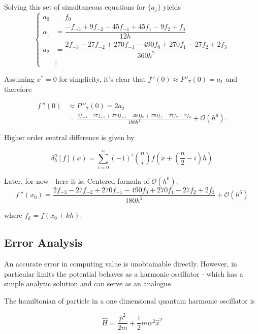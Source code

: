 Solving this set of simultaneous equations for $\{a_j\}$ yields
\begin{equation}
\begin{cases}
a_0 &= f_{0}\\[0.3cm]
a_1 &= \dfrac{-f_{-3}+9f_{-2}-45f_{-1}+45f_{1}-9f_{2}+f_{3}}{12h}\\[0.3cm]
a_2 &= \dfrac{2f_{-3}-27f_{-2}+270f_{-1}-490f_{0}+270f_{1}-27f_{2}+2f_{3}}{360h^2}\\[0.3cm]
&\vdots
\end{cases}
\end{equation}

Assuming $x^* = 0$ for simplicity, it's clear that $f\,'(0) \approx P\,'_7(0) = a_1$ and therefore

\begin{equation}
\begin{split}
f\,''(0)&\approx P\,''_7(0)=2a_2\\
&=\frac{2f_{-3}-27f_{-2}+270f_{-1}-490f_{0}+270f_{1}-27f_{2}+2f_{3}}{180h^{2}}+\mathcal{O}(h^{6}).
\end{split}
\end{equation}

Higher order central difference is given by

\begin{equation}
\delta^n_h[f](x) = \sum_{i = 0}^{n} (-1)^i \binom{n}{i} f\left(x + \left(\frac{n}{2} - i\right) h\right)
\end{equation}

Later, for now - here it is: Centered formula of $\mathcal{O}(h^{6})$.
\begin{equation}
f\,''(x_0)=\frac{2f_{-3}-27f_{-2}+270f_{-1}-490f_{0}+270f_{1}-27f_{2}+2f_{3}}{180h^{2}}+\mathcal{O}(h^{6})
\end{equation}

where $f_k = f(x_0 + kh)$.

\subsection{Error Analysis}\label{sec:cdifferr}
An accurate error in computing value is unobtainable directly. However, in particular limits the potential behaves as a harmonic oscillator - which has a simple analytic solution and can serve as an analogue.

The hamiltonian of particle in a one dimensional quantum harmonic oscillator is

\begin{equation}
\widehat{H} = \frac{\widehat{p}^2}{2m}+\frac{1}{2}mw^2\widehat{x}^2
\end{equation}

